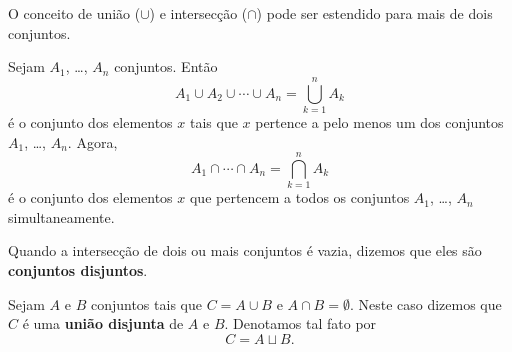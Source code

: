 O conceito de uni{\~a}o ($ \cup $) e intersec{\c c}{\~a}o ($ \cap $) pode ser estendido para mais de dois conjuntos.

\begin{definicao}
Sejam $A_{1}$, \dots, $A_{n}$ conjuntos. Ent{\~a}o
\[
A_{1} \cup A_{2} \cup \cdots \cup A_{n}= \displaystyle\bigcup_{k=1}^n A_{k}
\]
{\'e} o conjunto dos elementos $x$ tais que $x$ pertence a pelo menos um dos conjuntos $A_{1}$, \dots, $A_{n}$. Agora,
\[
A_{1} \cap \cdots \cap A_{n} = \displaystyle\bigcap_{k=1}^{n}A_{k}
\]
{\'e} o conjunto dos elementos $x$ que pertencem a todos os conjuntos $A_{1}$, \dots, $A_{n}$ simultaneamente.
\end{definicao}

Quando a intersec{\c c}{\~a}o de dois ou mais conjuntos {\'e} vazia, dizemos que eles s{\~a}o \textbf{conjuntos disjuntos}.

Sejam $A$ e $B$ conjuntos tais que $C = A \cup B$ e $A \cap B = \emptyset$. Neste caso dizemos que $C$ {\'e} uma \textbf{uni{\~a}o disjunta} de $A$ e $B$. Denotamos tal fato por
\[
C = A \sqcup B.
\]

